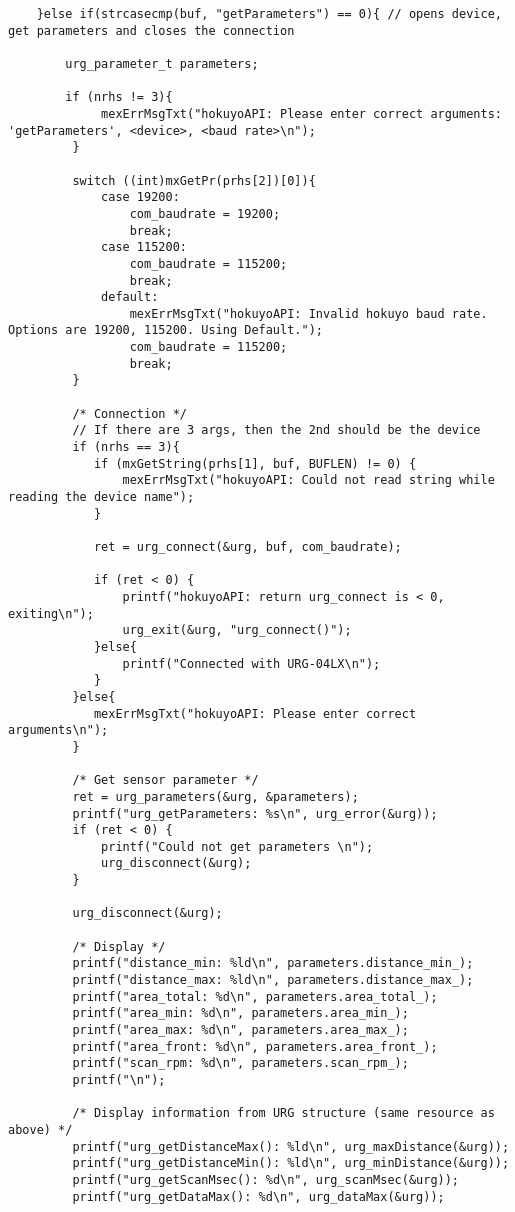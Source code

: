 \begin{lstlisting}
    }else if(strcasecmp(buf, "getParameters") == 0){ // opens device, get parameters and closes the connection

    	urg_parameter_t parameters;

        if (nrhs != 3){
             mexErrMsgTxt("hokuyoAPI: Please enter correct arguments: 'getParameters', <device>, <baud rate>\n");
         }

         switch ((int)mxGetPr(prhs[2])[0]){
             case 19200:
                 com_baudrate = 19200;
                 break;
             case 115200:
                 com_baudrate = 115200;
                 break;
             default:
                 mexErrMsgTxt("hokuyoAPI: Invalid hokuyo baud rate. Options are 19200, 115200. Using Default.");
                 com_baudrate = 115200;
                 break;
         }

         /* Connection */
         // If there are 3 args, then the 2nd should be the device
         if (nrhs == 3){
         	if (mxGetString(prhs[1], buf, BUFLEN) != 0) {
         		mexErrMsgTxt("hokuyoAPI: Could not read string while reading the device name");
         	}

         	ret = urg_connect(&urg, buf, com_baudrate);

         	if (ret < 0) {
         		printf("hokuyoAPI: return urg_connect is < 0, exiting\n");
         		urg_exit(&urg, "urg_connect()");
         	}else{
         		printf("Connected with URG-04LX\n");
         	}
         }else{
         	mexErrMsgTxt("hokuyoAPI: Please enter correct arguments\n");
         }

         /* Get sensor parameter */
         ret = urg_parameters(&urg, &parameters);
         printf("urg_getParameters: %s\n", urg_error(&urg));
         if (ret < 0) {
        	 printf("Could not get parameters \n");
        	 urg_disconnect(&urg);
         }

         urg_disconnect(&urg);

         /* Display */
         printf("distance_min: %ld\n", parameters.distance_min_);
         printf("distance_max: %ld\n", parameters.distance_max_);
         printf("area_total: %d\n", parameters.area_total_);
         printf("area_min: %d\n", parameters.area_min_);
         printf("area_max: %d\n", parameters.area_max_);
         printf("area_front: %d\n", parameters.area_front_);
         printf("scan_rpm: %d\n", parameters.scan_rpm_);
         printf("\n");

         /* Display information from URG structure (same resource as above) */
         printf("urg_getDistanceMax(): %ld\n", urg_maxDistance(&urg));
         printf("urg_getDistanceMin(): %ld\n", urg_minDistance(&urg));
         printf("urg_getScanMsec(): %d\n", urg_scanMsec(&urg));
         printf("urg_getDataMax(): %d\n", urg_dataMax(&urg));


\end{lstlisting}
